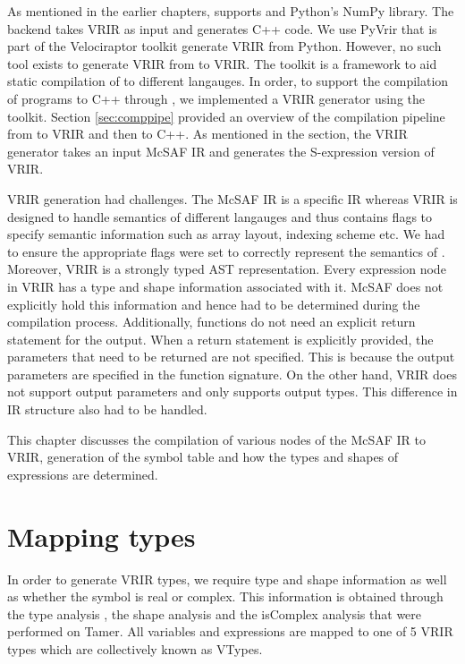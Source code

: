 As mentioned in the earlier chapters, \velocty supports \matlab and Python's NumPy library. The \velocty backend takes VRIR as input and generates C++ code. We use PyVrir that is part of the Velociraptor toolkit generate VRIR from Python. However, no such tool exists to generate VRIR from \matlab to VRIR. The \mclab toolkit is a framework to aid static compilation of \matlab to different langauges. In order, to support the compilation of \matlab programs to C++ through \velocty, we implemented a VRIR generator using the \mclab toolkit. Section \ref{sec:comppipe} provided an overview of the compilation pipeline from \matlab to VRIR and then to C++. As mentioned in the section, the VRIR generator takes an input McSAF IR and generates the S-expression version of VRIR.

VRIR generation had challenges. The McSAF IR is a \matlab specific IR whereas VRIR is designed to handle semantics of different langauges and thus contains flags to specify semantic information such as array layout, indexing scheme etc. We had to ensure the appropriate flags were set to correctly represent the semantics of \matlab. Moreover, VRIR is a strongly typed AST representation. Every expression node in VRIR has a type and shape information associated with it. McSAF does not explicitly hold this information and hence had to be determined during the compilation process. Additionally, \matlab functions do not need an explicit return statement for the output. When a return statement is explicitly provided, the parameters that need to be returned are not specified. This is because the output parameters are specified in the function signature. On the other hand, VRIR does not support output parameters and only supports output types. This difference in IR structure also had to be handled.

This chapter discusses the compilation of various nodes of the McSAF IR to VRIR, generation of the symbol table and how the types and shapes of expressions are determined.
\section{Mapping types}
In order to generate VRIR types, we require type and shape information as well as whether the symbol is real or complex. This information is obtained through the type analysis , the shape analysis and the isComplex analysis that were performed on Tamer. All variables and expressions are mapped to one of 5 VRIR types which are collectively known as VTypes.


